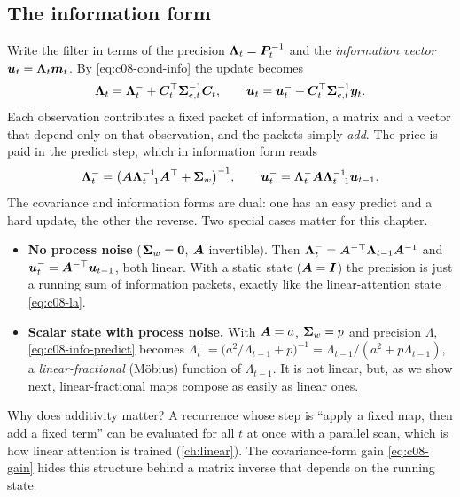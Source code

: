 \subsection{The information form}\label{sec:c08-info}

Write the filter in terms of the precision $\bm{\Lambda}_t=\bm{P}_t^{-1}$ and the \emph{information
vector} $\bm{u}_t=\bm{\Lambda}_t\bm{m}_t$. By \eqref{eq:c08-cond-info} the update becomes
\begin{equation}\label{eq:c08-info-update}
  \bm{\Lambda}_t = \bm{\Lambda}_t^- + \bm{C}_t^{\top}\bm{\Sigma}_{e,t}^{-1}\bm{C}_t,\qquad
  \bm{u}_t = \bm{u}_t^- + \bm{C}_t^{\top}\bm{\Sigma}_{e,t}^{-1}\bm{y}_t .
\end{equation}
Each observation contributes a fixed packet of information, a matrix and a vector that depend only
on that observation, and the packets simply \emph{add}. The price is paid in the predict step,
which in information form reads
\begin{equation}\label{eq:c08-info-predict}
  \bm{\Lambda}_t^- = \bigl(\bm{A}\bm{\Lambda}_{t-1}^{-1}\bm{A}^{\top}+\bm{\Sigma}_w\bigr)^{-1},\qquad
  \bm{u}_t^- = \bm{\Lambda}_t^-\bm{A}\bm{\Lambda}_{t-1}^{-1}\bm{u}_{t-1} .
\end{equation}
The covariance and information forms are dual: one has an easy predict and a hard update, the
other the reverse. Two special cases matter for this chapter.
\begin{itemize}
  \item \textbf{No process noise} ($\bm{\Sigma}_w=\bm{0}$, $\bm{A}$ invertible). Then
  $\bm{\Lambda}_t^-=\bm{A}^{-\top}\bm{\Lambda}_{t-1}\bm{A}^{-1}$ and $\bm{u}_t^-=\bm{A}^{-\top}\bm{u}_{t-1}$, both linear.
  With a static state ($\bm{A}=\bm{I}$) the precision is just a running sum of information packets,
  exactly like the linear-attention state \eqref{eq:c08-la}.
  \item \textbf{Scalar state with process noise.} With $\bm{A}=a$, $\bm{\Sigma}_w=p$ and precision
  $\Lambda$, \eqref{eq:c08-info-predict} becomes
  $\Lambda_t^-=\bigl(a^2/\Lambda_{t-1}+p\bigr)^{-1}=\Lambda_{t-1}/(a^2+p\Lambda_{t-1})$, a
  \emph{linear-fractional} (M\"obius) function of $\Lambda_{t-1}$. It is not linear, but, as we
  show next, linear-fractional maps compose as easily as linear ones.
\end{itemize}
Why does additivity matter? A recurrence whose step is ``apply a fixed map, then add a fixed
term'' can be evaluated for all $t$ at once with a parallel scan, which is how linear attention is
trained (\cref{ch:linear}). The covariance-form gain \eqref{eq:c08-gain} hides this structure
behind a matrix inverse that depends on the running state.

